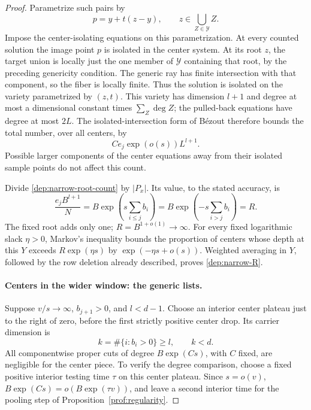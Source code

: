 \begin{proof}
Parametrize such pairs by
\[
 p=y+t(z-y),\qquad z\in\bigcup_{Z\in\mathcal Y}Z.
\]
Impose the center-isolating equations on this parametrization.
At every counted solution the image point $p$ is isolated in the
center system. At its root $z$, the target union is locally just
the one member of $\mathcal Y$ containing that root, by the preceding
genericity condition. The generic ray has finite intersection with
that component, so the fiber is locally finite. Thus the solution is
isolated on the variety parametrized by $(z,t)$.
This variety has dimension $l+1$ and degree at most a dimensional
constant times $\sum_Z\deg Z$; the pulled-back equations have degree
at most $2L$. The isolated-intersection form of B\'ezout therefore
bounds the total number, over all centers, by
\begin{equation}\label{dep:narrow-root-count}
 C e_j\exp(o(s))L^{l+1}.
\end{equation}
Possible larger components of the center equations away from their
isolated sample points do not affect this count.

Divide \eqref{dep:narrow-root-count} by $|P_x|$. Its value, to the
stated accuracy, is
\[
 \frac{e_j B^{l+1}}{N}
 =B\exp\left(s\sum_{i\le j}b_i\right)
 =B\exp\left(-s\sum_{i>j}b_i\right)=R.
\]
The fixed root adds only one; $R=B^{1+o(1)}\to\infty$.
For every fixed logarithmic slack $\eta>0$, Markov's inequality bounds
the proportion of centers whose depth at this $Y$ exceeds
$R\exp(\eta s)$ by $\exp(-\eta s+o(s))$.
Weighted averaging in $Y$, followed by the row deletion already
described, proves \eqref{dep:narrow-R}.

\paragraph{Centers in the wider window: the generic lists.}
Suppose $v/s\to\infty$, $b_{j+1}>0$, and $l<d-1$.
Choose an interior center plateau just to the right of zero, before
the first strictly positive center drop. Its carrier dimension is
\[
 k=\#\{i:b_i>0\}\ge l,
 \qquad k<d.
\]
All componentwise proper cuts of degree $B\exp(Cs)$, with $C$ fixed,
are negligible for the center piece. To verify the degree comparison,
choose a fixed positive interior testing time $\tau$ on this center
plateau. Since $s=o(v)$,
$B\exp(Cs)=o(B\exp(\tau v))$, and leave a second interior time for
the pooling step of Proposition~\ref{prof:regularity}.


\end{proof}
